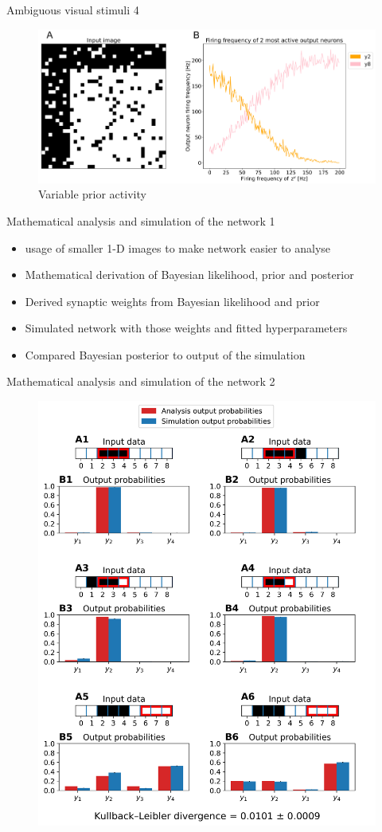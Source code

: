 \documentclass[aspectratio=169]{beamer}
\begin{document}
\begin{frame}{Ambiguous visual stimuli 4}
		\begin{figure}
        \includegraphics[width=0.7\linewidth]{../Latex/figures/horvertAdaptiveInh/YFrequency_prior.png}
      \\   \scriptsize Variable prior activity
      \end{figure} 
\end{frame}

\begin{frame}{Mathematical analysis and
 simulation of the network 1}
	\begin{itemize}
	  \item usage of smaller 1-D images to make network easier to analyse 
	  \item Mathematical derivation of Bayesian likelihood, prior and posterior
	  \item Derived synaptic weights from Bayesian likelihood and prior
	  \item Simulated network with those weights and fitted hyperparameters
	  \item Compared Bayesian posterior to output of the simulation
	\end{itemize}
\end{frame}

\begin{frame}{Mathematical analysis and
 simulation of the network 2}

		\begin{figure}
        \includegraphics[width=0.3\linewidth]{../Latex/figures/1D/1D_98_440_4.png}
      \end{figure} 



\end{frame}
\end{document}
